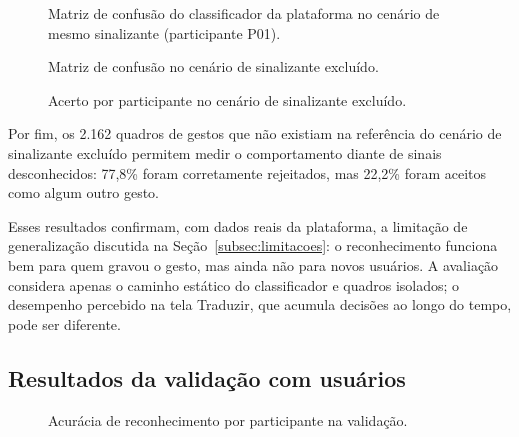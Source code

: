 \begin{figure}[htbp]
\centering
{}
\caption{Matriz de confusão do classificador da plataforma no cenário de mesmo
sinalizante (participante P01).}
\label{fig:cm-mesmo}
\end{figure}

\begin{figure}[htbp]
\centering
{}
\caption{Matriz de confusão no cenário de sinalizante excluído.}
\label{fig:cm-excluido}
\end{figure}

\begin{figure}[htbp]
\centering
{}
\caption{Acerto por participante no cenário de sinalizante excluído.}
\label{fig:acerto-part}
\end{figure}

Por fim, os 2.162 quadros de gestos que não existiam na referência do cenário de
sinalizante excluído permitem medir o comportamento diante de sinais
desconhecidos: 77,8\% foram corretamente rejeitados, mas 22,2\% foram aceitos
como algum outro gesto.

Esses resultados confirmam, com dados reais da plataforma, a limitação de
generalização discutida na Seção~\ref{subsec:limitacoes}: o reconhecimento
funciona bem para quem gravou o gesto, mas ainda não para novos usuários. A
avaliação considera apenas o caminho estático do classificador e quadros
isolados; o desempenho percebido na tela Traduzir, que acumula decisões ao longo
do tempo, pode ser diferente.

\subsection{Resultados da validação com usuários}


\begin{figure}[htbp]
\centering
{}
\caption{Acurácia de reconhecimento por participante na validação.}
\label{fig:acuracia-validacao}
\end{figure}

